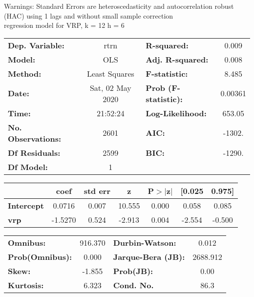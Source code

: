 Warnings: \newline
 [1] Standard Errors are heteroscedasticity and autocorrelation robust (HAC) using 1 lags and without small sample correction\\ 

regression model for VRP, k = 12 h = 6\begin{center}
\begin{tabular}{lclc}
\toprule
\textbf{Dep. Variable:}    &       rtrn       & \textbf{  R-squared:         } &     0.009   \\
\textbf{Model:}            &       OLS        & \textbf{  Adj. R-squared:    } &     0.008   \\
\textbf{Method:}           &  Least Squares   & \textbf{  F-statistic:       } &     8.485   \\
\textbf{Date:}             & Sat, 02 May 2020 & \textbf{  Prob (F-statistic):} &  0.00361    \\
\textbf{Time:}             &     21:52:24     & \textbf{  Log-Likelihood:    } &    653.05   \\
\textbf{No. Observations:} &        2601      & \textbf{  AIC:               } &    -1302.   \\
\textbf{Df Residuals:}     &        2599      & \textbf{  BIC:               } &    -1290.   \\
\textbf{Df Model:}         &           1      & \textbf{                     } &             \\
\bottomrule
\end{tabular}
\begin{tabular}{lcccccc}
                   & \textbf{coef} & \textbf{std err} & \textbf{z} & \textbf{P$> |$z$|$} & \textbf{[0.025} & \textbf{0.975]}  \\
\midrule
\textbf{Intercept} &       0.0716  &        0.007     &    10.555  &         0.000        &        0.058    &        0.085     \\
\textbf{vrp}       &      -1.5270  &        0.524     &    -2.913  &         0.004        &       -2.554    &       -0.500     \\
\bottomrule
\end{tabular}
\begin{tabular}{lclc}
\textbf{Omnibus:}       & 916.370 & \textbf{  Durbin-Watson:     } &    0.012  \\
\textbf{Prob(Omnibus):} &   0.000 & \textbf{  Jarque-Bera (JB):  } & 2688.912  \\
\textbf{Skew:}          &  -1.855 & \textbf{  Prob(JB):          } &     0.00  \\
\textbf{Kurtosis:}      &   6.323 & \textbf{  Cond. No.          } &     86.3  \\
\bottomrule
\end{tabular}
\end{center}

